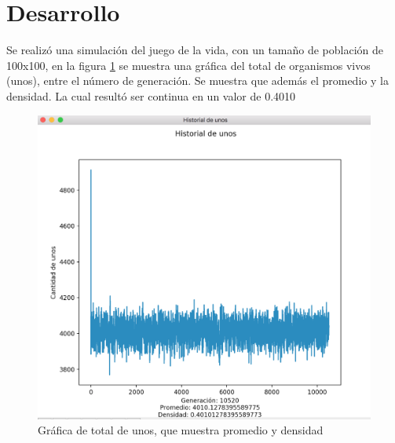 \section{Desarrollo}
	Se realizó una simulación del juego de la vida, con un tamaño de población de 100x100, en la figura \ref{fig:patron1} se muestra una gráfica del total de organismos vivos (unos), entre el número de generación. Se muestra que además el promedio y la densidad. La cual resultó ser continua en un valor de 0.4010

	\begin{figure}[H]
		\begin{center}
			\includegraphics[scale=.5]{img/grafica.png}
			\caption{Gráfica de total de unos, que muestra promedio y densidad}
			\label{fig:patron1}
		\end{center}
	\end{figure}

